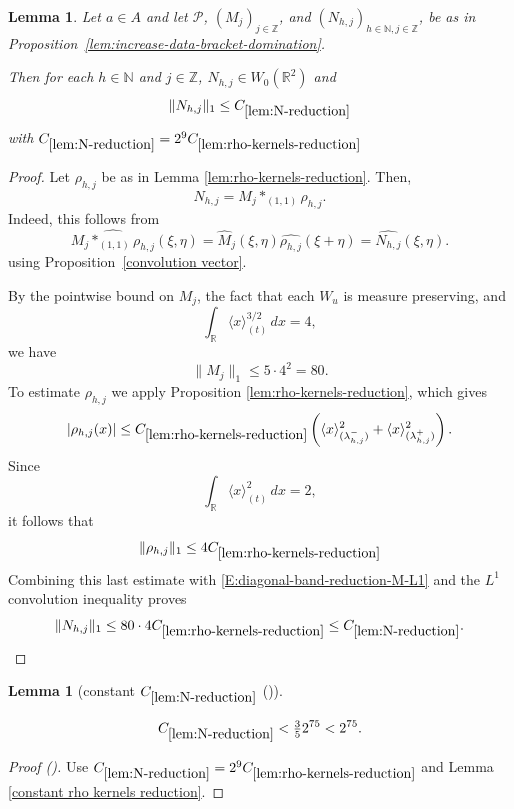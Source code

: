 \documentclass[12pt,reqno]{amsart}
\newcommand{\auto}{{({\tiny\faCar})}}
\theoremstyle{plain}
\newtheorem{lemma}[theorem]{Lemma}
\numberwithin{equation}{section}
\theoremstyle{remark}
\newcommand{\uses}[1]{}
\newcommand{\usesdefs}[1]{}
\newcommand{\leanok}{}
\newcommand{\lean}[1]{}
\newcommand{\Z}{{\mathbb Z}}
\newcommand{\R}{{\mathbb R}}
\newcommand{\N}{{\mathbb N}}
\begin{document}
\begin{lemma}
\label{lem:N-reduction}\uses{lem:rho-kernels-reduction,convolution vector,lem:increase-data-bracket-domination}\usesdefs{bracket bump,auto:Wiener-space-definition,auto:convolution-along-vector-definition,multiplicatively spaced monotone sequences,auto:unitary-matrices-definition} Let $a\in A$ and let $\mathcal P$, $(M_j)_{j\in \Z}$, and $(N_{h,j})_{h\in \N,j\in \Z}$,  be as in Proposition~\ref{lem:increase-data-bracket-domination}.
\lean{Auto.nReduction}
\leanok
Then for each $h\in \N$ and $j\in \Z$,   $N_{h,j}\in W_0(\R^2)$ and
\begin{equation}
    \label{E:diagonal-band-reduction-N-L1}
    \|N_{h,j}\|_1\leq  C_{\ref{lem:N-reduction}}
\end{equation}
with $C_{\ref{lem:N-reduction}} = 2^9C_{\ref{lem:rho-kernels-reduction}}$
\end{lemma}
\begin{proof}
Let \(\rho_{h,j}\) be as in Lemma \ref{lem:rho-kernels-reduction}.
Then,
\[
N_{h,j}=M_j\ast_{(1,1)}\rho_{h,j}.
\]
Indeed, this follows from
\[
\widehat{M_j\ast_{(1,1)}\rho_{h,j}}(\xi,\eta)
=
\widehat M_j(\xi,\eta)
\widehat{\rho_{h,j}}(\xi+\eta)
=
\widehat{N_{h,j}}(\xi,\eta).
\]
using Proposition~\ref{convolution vector}.


By the pointwise bound on \(M_j\), the fact that each
\(W_u\) is measure preserving, and
\[
\int_{\mathbb R}\langle x\rangle_{(t)}^{3/2}\,dx=4,
\]
we have
\begin{equation}
    \label{E:diagonal-band-reduction-M-L1}
    \|M_j\|_1
    \leq
    5\cdot 4^2
    =
    80.
\end{equation}
 To estimate  $\rho_{h,j}$  we   apply  Proposition \ref{lem:rho-kernels-reduction},
which gives
\[
|\rho_{h,j}(x)|
\leq
C_{\ref{lem:rho-kernels-reduction}}
\left(
\langle x\rangle_{(\lambda_{h,j}^-)}^2
+
\langle x\rangle_{(\lambda_{h,j}^+)}^2
\right).
\]
Since
\[
\int_{\mathbb R}\langle x\rangle_{(t)}^2\,dx=2,
\]
it follows that
\[
\|\rho_{h,j}\|_1
\leq
4C_{\ref{lem:rho-kernels-reduction}}
\]
Combining this last estimate with
\eqref{E:diagonal-band-reduction-M-L1} and the \(L^1\) convolution
inequality proves
\[
\|N_{h,j}\|_1
\leq
80\cdot 4 C_{\ref{lem:rho-kernels-reduction}}
\leq
C_{\ref{lem:N-reduction}}.
\]
\end{proof}

\begin{lemma}[constant $C_{\ref{lem:N-reduction}}$ \auto]\label{constant N reduction}\uses{lem:N-reduction,lem:rho-kernels-reduction,constant rho kernels reduction}\usesdefs{}
\lean{Auto.constantNReduction}
\leanok
\begin{equation}\label{constant N reduction bound}
C_{\ref{lem:N-reduction}}
<\tfrac35 2^{75}<2^{75}.
\end{equation}
\end{lemma}
\begin{proof}[Proof \auto]
Use $C_{\ref{lem:N-reduction}}=2^9C_{\ref{lem:rho-kernels-reduction}}$ and Lemma \ref{constant rho kernels reduction}.
\end{proof}
\end{document}
